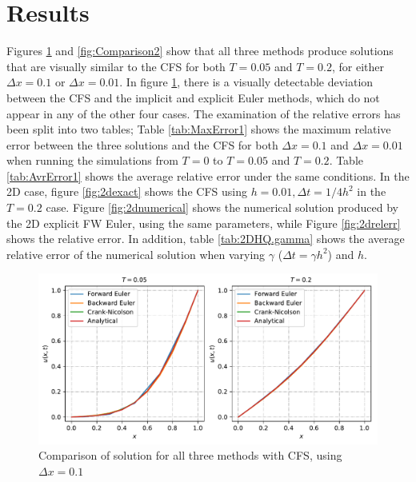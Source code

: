 \documentclass[%
oneside,                 %
final,                   %
10pt]{article}
\begin{document}
\section{Results}
Figures \ref{fig:Comparison1} and \ref{fig:Comparison2} show that all three methods produce solutions that are visually similar to the CFS for both $T=0.05$ and $T=0.2$, for either $\Delta x =0.1$ or $\Delta x =0.01$. In figure \ref{fig:Comparison1}, there is a visually detectable deviation between the CFS and the implicit and explicit Euler methods, which do not appear in any of the other four cases. \newline
The examination of the relative errors has been split into two tables; Table \ref{tab:MaxError1} shows the maximum relative error between the three solutions and the CFS for both $\Delta x=0.1$ and $\Delta x=0.01$ when running the simulations from $T=0$ to $T=0.05$ and $T=0.2$. Table \ref{tab:AvrError1} shows the average relative error under the same conditions.\newline
In the 2D case, figure \ref{fig:2dexact} shows the CFS using $h=0.01, \Delta t=1/4h^2$ in the $T=0.2$ case. Figure \ref{fig:2dnumerical} shows the numerical solution produced by the 2D explicit FW Euler, using the same parameters, while Figure \ref{fig:2drelerr} shows the relative error. In addition, table \ref{tab:2DHQ.gamma} shows the average relative error of the numerical solution when varying $\gamma$ ($\Delta t= \gamma h^2$) and $h$.



\begin{figure}[!htb]
        \centering 
         \includegraphics[scale=.6]{../Results/Comparison_1.pdf} 
        \caption{Comparison of solution for all three methods with CFS,  using $\Delta x=0.1$}
        \label{fig:Comparison1}   
\end{figure}  
\end{document}
